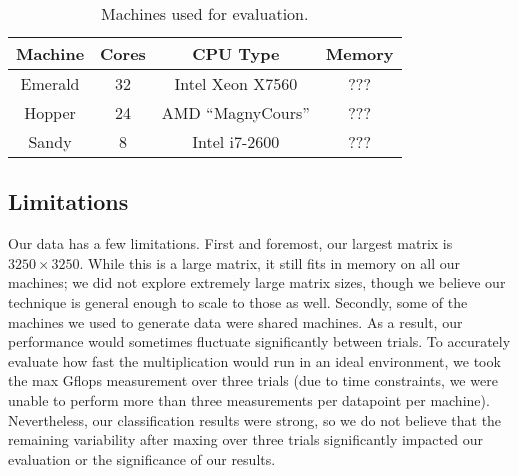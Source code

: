 \begin{table}[t]
    \begin{center}
        \begin{tabular}{c|c|c|c}
            Machine & Cores & CPU Type & Memory \\ \hline
            Emerald & 32 & Intel Xeon X7560 & ??? \\
            Hopper & 24 & AMD ``MagnyCours'' & ??? \\
            Sandy & 8 & Intel i7-2600 & ??? \\
        \end{tabular}
    \end{center}
    \caption{Machines used for evaluation.}
    \label{t:machines}
\end{table}

\subsection{Limitations}
Our data has a few limitations.
First and foremost, our largest matrix is $3250\times{3250}$.
While this is a large matrix, it still fits in memory on all our machines; we did not explore extremely large matrix sizes, though we believe our technique is general enough to scale to those as well.
Secondly, some of the machines we used to generate data were shared machines.
As a result, our performance would sometimes fluctuate significantly between trials.
To accurately evaluate how fast the multiplication would run in an ideal environment, we took the max Gflops measurement over three trials (due to time constraints, we were unable to perform more than three measurements per datapoint per machine).
Nevertheless, our classification results were strong, so we do not believe that the remaining variability after maxing over three trials significantly impacted our evaluation or the significance of our results.
